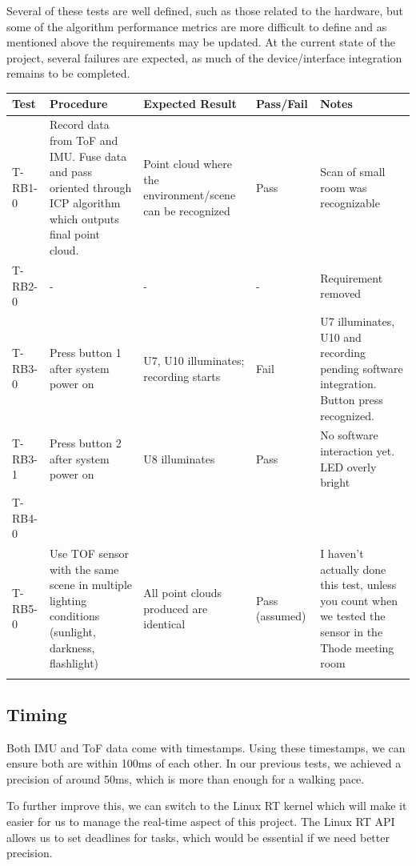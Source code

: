 \documentclass[11pt]{article}
\begin{document}
	Several of these tests are well defined, such as those related to the hardware, but some of the algorithm performance metrics are more difficult to define and as mentioned above the requirements may be updated. At the current state of the project, several failures are expected, as much of the device/interface integration remains to be completed. 
	
	\begin{tabularx}{\textwidth}{X p{} p{} X p{}}
		\toprule
		\textbf{Test} & \textbf{Procedure} & \textbf{Expected Result} & \textbf{Pass/Fail} & \textbf{Notes}
		\\
		\midrule
		T-RB1-0 & Record data from ToF and IMU. Fuse data and pass oriented through ICP algorithm which outputs final point cloud. & Point cloud where the environment/scene can be recognized & Pass & Scan of small room was recognizable 
		\\
		\midrule
		T-RB2-0 & - & - & - & Requirement removed 
		\\
		\midrule
		T-RB3-0 & Press button 1 after system power on & U7, U10 illuminates; recording starts & Fail & U7 illuminates, U10 and recording pending software integration. Button press recognized.
		\\
		\midrule
		T-RB3-1 & Press button 2 after system power on & U8 illuminates & Pass & No software interaction yet. LED overly bright 
		\\
		\midrule
		T-RB4-0 & & & &
		\\
		\midrule
		T-RB5-0 & Use TOF sensor with the same scene in multiple lighting conditions (sunlight, darkness, flashlight) & All point clouds produced are identical & Pass (assumed) & I haven’t actually done this test, unless you count when we tested the sensor in the Thode meeting room \\
		\bottomrule
		\caption{Verification Tests for Behavioural Requirements}
	\end{tabularx}
	
	
	\subsection{Timing} 
	
	Both IMU and ToF data come with timestamps. Using these timestamps, we can ensure both are within 100ms of each other. In our previous tests, we achieved a precision of around 50ms, which is more than enough for a walking pace. 
	
	To further improve this, we can switch to the Linux RT kernel which will make it easier for us to manage the real-time aspect of this project. The Linux RT API allows us to set deadlines for tasks, which would be essential if we need better precision. 
	
\end{document}
